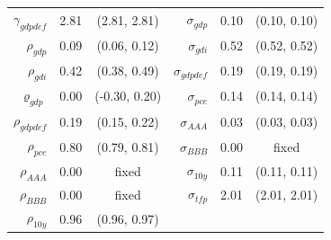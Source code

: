 \documentclass[12pt]{article}
\begin{document}
{\begin{longtable}{rrc@{\hspace{1in}}rrc}
$\gamma_{gdpdef}$ & 2.81 & (2.81, 2.81) & $\sigma_{gdp}$ & 0.10 & (0.10, 0.10) \\
$\rho_{gdp}$ & 0.09 & (0.06, 0.12) & $\sigma_{gdi}$ & 0.52 & (0.52, 0.52) \\
$\rho_{gdi}$ & 0.42 & (0.38, 0.49) & $\sigma_{gdpdef}$ & 0.19 & (0.19, 0.19) \\
$\varrho_{gdp}$ & 0.00 & (-0.30, 0.20) & $\sigma_{pce}$ & 0.14 & (0.14, 0.14) \\
$\rho_{gdpdef}$ & 0.19 & (0.15, 0.22) & $\sigma_{AAA}$ & 0.03 & (0.03, 0.03) \\
$\rho_{pce}$ & 0.80 & (0.79, 0.81) & $\sigma_{BBB}$ & 0.00 & \scriptsize{fixed} \\
$\rho_{AAA}$ & 0.00 & \scriptsize{fixed} & $\sigma_{10y}$ & 0.11 & (0.11, 0.11) \\
$\rho_{BBB}$ & 0.00 & \scriptsize{fixed} & $\sigma_{tfp}$ & 2.01 & (2.01, 2.01) \\
$\rho_{10y}$ & 0.96 & (0.96, 0.97) & & & \\[3pt]
\end{longtable}}
\end{document}
